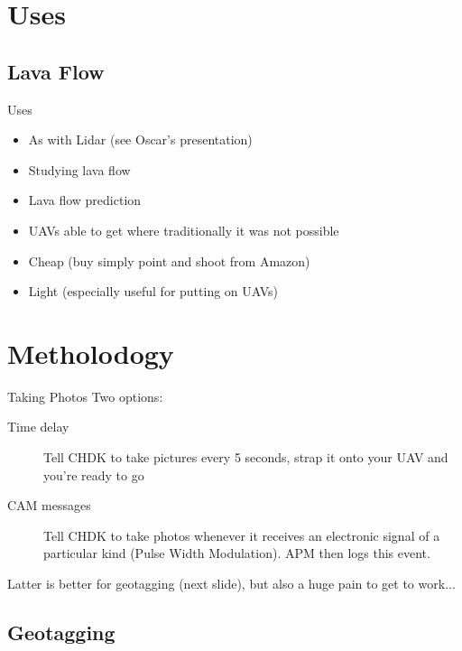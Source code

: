 \documentclass[table]{beamer}
\begin{document}
\section{Uses}

\subsection{Lava Flow}

\begin{frame}{Uses}
    \begin{itemize}
        \item As with Lidar (see Oscar's presentation)
        \item Studying lava flow
        \item Lava flow prediction
        \item UAVs able to get where traditionally it was not possible
        \item Cheap (buy simply point and shoot from Amazon)
        \item Light (especially useful for putting on UAVs)
    \end{itemize}
\end{frame}

\section{Metholodogy}

\begin{frame}{Taking Photos}
    Two options:
    \begin{description}
        \item[Time delay] Tell CHDK to take pictures every 5 seconds, strap it onto your UAV
            and you're ready to go
        \item[CAM messages] Tell CHDK to take photos whenever it receives an electronic signal
            of a particular kind (Pulse Width Modulation). APM then logs this
            event.
    \end{description}
    Latter is better for geotagging (next slide), but also a huge pain to get to
    work...
\end{frame}

\subsection{Geotagging}
\end{document}

